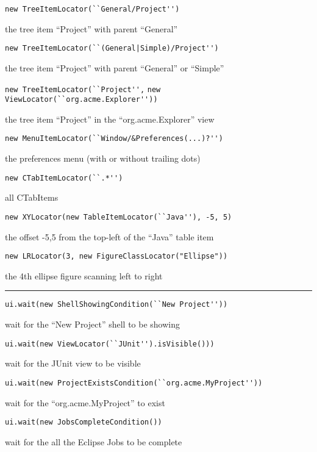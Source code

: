 \documentclass[10pt, twocolumn]{article}
\newcommand{\topic}[1]{
\hRule

{\sf{\textbf{#1}}}
\vspace{0.05in}

}
\newcommand{\code}[1]{\lstinline[basicstyle=\small\ttfamily]{#1}}
\newcommand{\hRule}{\rule{\linewidth}{0.2mm}}
\newcommand{\Indent}{\hspace{0.2in}}
\newcommand{\desc}[1]{\Indent\parbox[b]{3.5in}{#1}}
\begin{document}
\code{new TreeItemLocator(``General/Project'')}

\desc{the tree item ``Project'' with parent ``General''}

\code{new TreeItemLocator(``(General|Simple)/Project'')}

\desc{the tree item ``Project'' with parent ``General'' or ``Simple''}

\code{new TreeItemLocator(``Project'',}
\indent\indent\indent\code{new ViewLocator(``org.acme.Explorer''))}

\desc{the tree item ``Project'' in the ``org.acme.Explorer'' view}

\code{new MenuItemLocator(``Window/&Preferences(...)?'')}

\desc{the preferences menu (with or without trailing dots)}

%

\code{new CTabItemLocator(``.*'')}

\desc{all CTabItems}

\code{new XYLocator(new TableItemLocator(``Java''), -5, 5)}

\desc{the offset -5,5 from the top-left of the ``Java'' table item}

\code{new LRLocator(3, new FigureClassLocator("Ellipse"))}

\desc{the 4th ellipse figure scanning left to right}



\topic{Conditions}

\code{ui.wait(new ShellShowingCondition(``New Project''))}

\desc{wait for the ``New Project'' shell to be showing}

\code{ui.wait(new ViewLocator(``JUnit'').isVisible()))}

\desc{wait for the JUnit view to be visible}

\code{ui.wait(new ProjectExistsCondition(``org.acme.MyProject''))}

\desc{wait for the ``org.acme.MyProject'' to exist}

\code{ui.wait(new JobsCompleteCondition())}

\desc{wait for the all the Eclipse Jobs to be complete}
\end{document}
